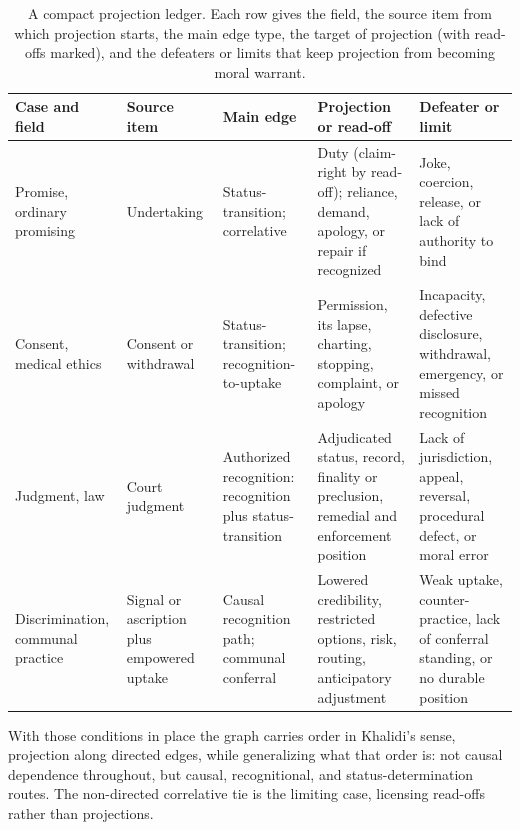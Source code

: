 \documentclass[12pt]{article}
\begin{document}
\begin{table}[H]
\centering
\footnotesize
\setlength{\tabcolsep}{3pt}
\begin{tabular}{@{}>{\raggedright\arraybackslash}p{}>{\raggedright\arraybackslash}p{}>{\raggedright\arraybackslash}p{}>{\raggedright\arraybackslash}p{}>{\raggedright\arraybackslash}p{}@{}}
\toprule
Case and field & Source item & Main edge & Projection or read-off & Defeater or limit \\
\midrule
Promise, ordinary promising & Undertaking & Status-transition; correlative & Duty (claim-right by read-off); reliance, demand, apology, or repair if recognized & Joke, coercion, release, or lack of authority to bind \\
Consent, medical ethics & Consent or withdrawal & Status-transition; recognition-to-uptake & Permission, its lapse, charting, stopping, complaint, or apology & Incapacity, defective disclosure, withdrawal, emergency, or missed recognition \\
Judgment, law & Court judgment & Authorized recognition: recognition plus status-transition & Adjudicated status, record, finality or preclusion, remedial and enforcement position \citep[\S\S~17--19, 24, 27]{americanLawInstitute1982RestatementJudgments} & Lack of jurisdiction, appeal, reversal, procedural defect, or moral error \\
Discrimination, communal practice & Signal or ascription plus empowered uptake & Causal recognition path; communal conferral & Lowered credibility, restricted options, risk, routing, anticipatory adjustment & Weak uptake, counter-practice, lack of conferral standing, or no durable position \\
\bottomrule
\end{tabular}
\caption{A compact projection ledger. Each row gives the field, the source item from which projection starts, the main edge type, the target of projection (with read-offs marked), and the defeaters or limits that keep projection from becoming moral warrant.}
\label{tab:projection-ledger}
\end{table}

With those conditions in place the graph carries order in Khalidi's sense, projection along directed edges, while generalizing what that order is: not causal dependence throughout, but causal, recognitional, and status-determination routes. The non-directed correlative tie is the limiting case, licensing read-offs rather than projections.
\end{document}
